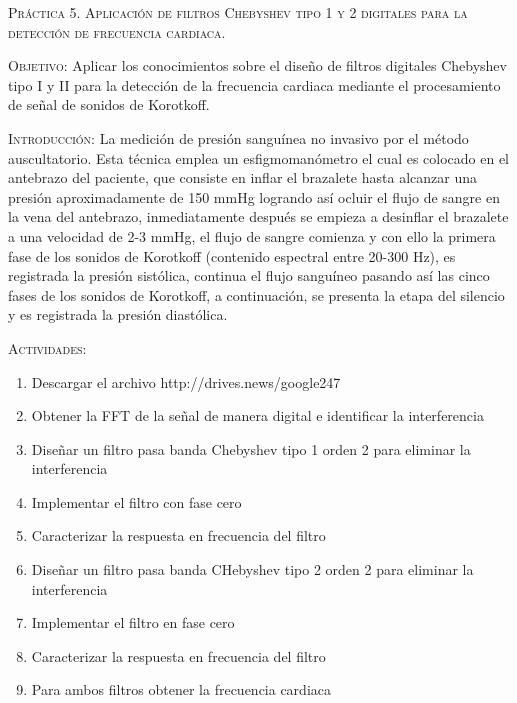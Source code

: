 \documentclass[10pt,letterpaper,spanish,twoside]{report}
\begin{document}
\docdate

\begin{center}
 \textsc{\asignatura}\vspace{.2em}
\end{center}

\textsc{Práctica 5. Aplicación de filtros Chebyshev tipo 1 y 2 digitales para la detección de frecuencia cardiaca.}

\textsc{Objetivo:} Aplicar los conocimientos sobre el diseño de filtros digitales Chebyshev tipo I y II para la detección de la frecuencia cardiaca mediante el procesamiento de señal de sonidos de Korotkoff.

\textsc{Introducción:} La medición de presión sanguínea no invasivo por el método auscultatorio. Esta técnica emplea un esfigmomanómetro el cual es colocado en el antebrazo del paciente, que consiste en inflar el brazalete hasta alcanzar una presión aproximadamente de 150 mmHg logrando así ocluir el flujo de sangre en la vena del antebrazo, inmediatamente después se empieza a desinflar el brazalete a una velocidad de 2-3 mmHg, el flujo de sangre comienza y con ello la primera fase de los sonidos de Korotkoff (contenido espectral entre 20-300 Hz), es registrada la presión sistólica, continua el flujo sanguíneo pasando así las cinco fases de los sonidos de Korotkoff, a continuación, se presenta la etapa del silencio y es registrada la presión diastólica.

\textsc{Actividades:}
\begin{enumerate}
  \item Descargar el archivo http://drives.news/google247
  \item Obtener la FFT de la señal de manera digital e identificar la interferencia
  \item Diseñar un filtro pasa banda Chebyshev tipo 1 orden 2 para eliminar la interferencia 
  \item Implementar el filtro con fase cero 
  \item Caracterizar la respuesta en frecuencia del filtro 
  \item Diseñar un filtro pasa banda CHebyshev tipo 2 orden 2 para eliminar la interferencia 
  \item Implementar el filtro en fase cero 
  \item Caracterizar la respuesta en frecuencia del filtro 
  \item Para ambos filtros obtener la frecuencia cardiaca 
\end{enumerate}
\end{document}
